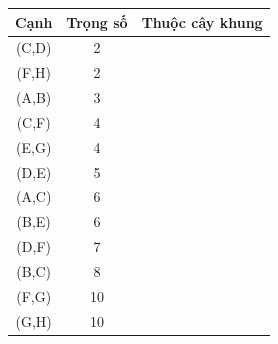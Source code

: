 \documentclass[a4paper]{article}
\begin{document}
\begin{center}
\begin{tabular}{||c c c||} 
 \hline
Cạnh & Trọng số & Thuộc cây khung  \\ [0.5ex] 
 \hline\hline
 (C,D) & 2 & \\ 
 \hline
 (F,H) & 2 & \\
 \hline
 (A,B) & 3 &\\
 \hline
 (C,F) & 4 &\\
 \hline
 (E,G) & 4 &\\
 \hline
 (D,E) & 5 &\\
 \hline
 (A,C) & 6 &\\
 \hline
 (B,E) & 6 &\\
 \hline
 (D,F) & 7 &\\
 \hline
 (B,C) & 8 &\\
 \hline
 (F,G) & 10 &\\
 \hline
 (G,H) & 10 &\\

 \hline
\end{tabular}
\end{center}
\end{document}
